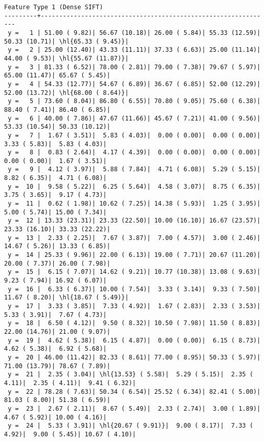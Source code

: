 \documentclass[10pt]{article}
\newcommand{\hl}[1]{\textcolor{blue}{#1}}
\begin{document}
\begin{Verbatim}[fontsize=\small, commandchars=\\\{\}]
            Feature Type 1 (Dense SIFT)
---------+---------------------------------------------------------------
 y =   1 | 51.00 ( 9.82)| 56.67 (10.18)| 26.00 ( 5.84)| 55.33 (12.59)| 50.33 (10.71)| \hl{65.33 ( 9.45)}|
 y =   2 | 25.00 (12.40)| 43.33 (11.11)| 37.33 ( 6.63)| 25.00 (11.14)| 44.00 ( 9.53)| \hl{55.67 (11.87)}|
 y =   3 | 81.33 ( 6.52)| 78.00 ( 2.81)| 79.00 ( 7.38)| 79.67 ( 5.97)| 65.00 (11.47)| 65.67 ( 5.45)|
 y =   4 | 54.33 (12.77)| 54.67 ( 6.89)| 36.67 ( 6.85)| 52.00 (12.29)| 52.00 (13.72)| \hl{68.00 ( 8.64)}|
 y =   5 | 73.60 ( 8.04)| 86.80 ( 6.55)| 70.80 ( 9.05)| 75.60 ( 6.38)| 88.40 ( 7.41)| 86.40 ( 6.85)|
 y =   6 | 40.00 ( 7.86)| 47.67 (11.66)| 45.67 ( 7.21)| 41.00 ( 9.56)| 53.33 (10.54)| 50.33 (10.12)|
 y =   7 |  1.67 ( 3.51)|  5.83 ( 4.03)|  0.00 ( 0.00)|  0.00 ( 0.00)|  3.33 ( 5.83)|  5.83 ( 4.03)|
 y =   8 |  0.83 ( 2.64)|  4.17 ( 4.39)|  0.00 ( 0.00)|  0.00 ( 0.00)|  0.00 ( 0.00)|  1.67 ( 3.51)|
 y =   9 |  4.12 ( 3.97)|  5.88 ( 7.84)|  4.71 ( 6.08)|  5.29 ( 5.15)|  8.82 ( 6.35)|  4.71 ( 6.08)|
 y =  10 |  9.58 ( 5.22)|  6.25 ( 5.64)|  4.58 ( 3.07)|  8.75 ( 6.35)|  3.75 ( 3.65)|  9.17 ( 4.73)|
 y =  11 |  0.62 ( 1.98)| 10.62 ( 7.25)| 14.38 ( 5.93)|  1.25 ( 3.95)|  5.00 ( 5.74)| 15.00 ( 7.34)|
 y =  12 | 13.33 (23.31)| 23.33 (22.50)| 10.00 (16.10)| 16.67 (23.57)| 23.33 (16.10)| 33.33 (22.22)|
 y =  13 |  2.33 ( 2.25)|  7.67 ( 3.87)|  7.00 ( 4.57)|  3.00 ( 2.46)| 14.67 ( 5.26)| 13.33 ( 6.85)|
 y =  14 | 25.33 ( 9.96)| 22.00 ( 6.13)| 19.00 ( 7.71)| 20.67 (11.20)| 20.00 ( 7.37)| 26.00 ( 7.98)|
 y =  15 |  6.15 ( 7.07)| 14.62 ( 9.21)| 10.77 (10.38)| 13.08 ( 9.63)|  9.23 ( 7.94)| 16.92 ( 6.07)|
 y =  16 |  6.33 ( 6.37)| 10.00 ( 7.54)|  3.33 ( 3.14)|  9.33 ( 7.50)| 11.67 ( 8.20)| \hl{18.67 ( 5.49)}|
 y =  17 |  3.33 ( 3.85)|  7.33 ( 4.92)|  1.67 ( 2.83)|  2.33 ( 3.53)|  5.33 ( 3.91)|  7.67 ( 4.73)|
 y =  18 |  6.50 ( 4.12)|  9.50 ( 8.32)| 10.50 ( 7.98)| 11.50 ( 8.83)| 22.00 (14.76)| 21.00 ( 9.07)|
 y =  19 |  4.62 ( 5.38)|  6.15 ( 4.87)|  0.00 ( 0.00)|  6.15 ( 8.73)|  4.62 ( 5.38)|  6.92 ( 5.68)|
 y =  20 | 46.00 (11.42)| 82.33 ( 8.61)| 77.00 ( 8.95)| 50.33 ( 5.97)| 71.00 (13.79)| 78.67 ( 7.89)|
 y =  21 |  2.35 ( 3.04)| \hl{13.53} ( 5.58)|  5.29 ( 5.15)|  2.35 ( 4.11)|  2.35 ( 4.11)|  9.41 ( 6.32)|
 y =  22 | 78.28 ( 7.63)| 50.34 ( 6.54)| 25.52 ( 6.34)| 82.41 ( 5.00)| 81.03 ( 8.00)| 51.38 ( 6.59)|
 y =  23 |  2.67 ( 2.11)|  8.67 ( 5.49)|  2.33 ( 2.74)|  3.00 ( 1.89)|  4.67 ( 5.92)| 10.00 ( 4.16)|
 y =  24 |  5.33 ( 3.91)| \hl{20.67 ( 9.91)}|  9.00 ( 8.17)|  7.33 ( 4.92)|  9.00 ( 5.45)| 10.67 ( 4.10)|

\end{Verbatim}
\end{document}
